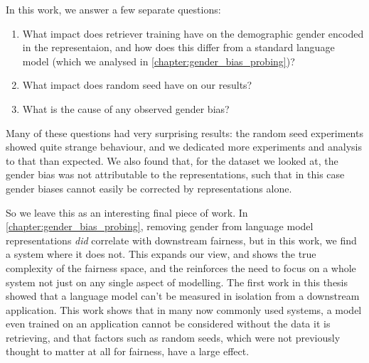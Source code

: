 In this work, we answer a few separate questions:
\begin{enumerate}
    \item What impact does retriever training have on the demographic gender encoded in the representaion, and how does this differ from a standard language model (which we analysed in \ref{chapter:gender_bias_probing})?
    \item What impact does random seed have on our results?
    \item What is the cause of any observed gender bias?
\end{enumerate}

Many of these questions had very surprising results: the random seed experiments showed quite strange behaviour, and we dedicated more experiments and analysis to that than expected. We also found that, for the dataset we looked at, the gender bias was not attributable to the representations, such that in this case gender biases cannot easily be corrected by representations alone. 

So we leave this as an interesting final piece of work. In \ref{chapter:gender_bias_probing}, removing gender from language model representations \textit{did} correlate with downstream fairness, but in this work, we find a system where it does not. This expands our view, and shows the true complexity of the fairness space, and the reinforces the need to focus on a whole system not just on any single aspect of modelling. The first work in this thesis showed that a language model can't be measured in isolation from a downstream application. This work shows that in many now commonly used systems, a model even trained on an application cannot be considered without the data it is retrieving, and that factors such as random seeds, which were not previously thought to matter at all for fairness, have a large effect. 




